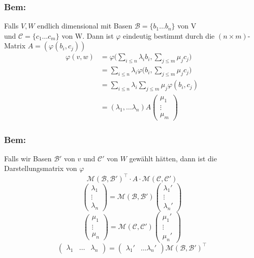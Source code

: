 \documentclass[titlepage,12pt,a4paper,ngerman]{report}
\begin{document}
\subsubsection*{Bem:} Falls $V, W$ endlich dimensional mit Basen $\mathcal B = \{b_1 \dots b_n\}$ von V\\
und $\mathcal C = \{c_1 \dots c_m\}$ von W. Dann ist $\varphi$ eindeutig bestimmt durch die $(n \times m)$-Matrix $A= (\varphi(b_i, c_j))$
\begin{align*}
\varphi(v, w) &= \varphi \bigg(\sum_{i \leq n} \lambda_i b_i, \sum_{j \leq m}\mu_j c_j\bigg)\\
&= \sum_{i \leq n} \lambda_i \varphi \bigg(b_i, \sum_{j \leq m} \mu_j c_j \bigg)\\
&= \sum_{i \leq n} \lambda_i \sum_{j \leq m} \mu_j \varphi(b_i, c_j)\\
&= (\lambda_1, \dots \lambda_n)A \begin{pmatrix}
\mu_1 \\ \vdots \\ \mu_m
\end{pmatrix}
\end{align*}

\subsubsection{Bem:}
Falls wir Basen $ \mathcal{B}' $ von $ v $ und $ \mathcal{C}' $ von $ W $ gewählt hätten, dann ist die Darstellungsmatrix von $ \varphi $
$$\mathcal{M}(\mathcal{B},\mathcal{B}')^\top \cdot A \cdot \mathcal{M}(\mathcal{C}, \mathcal{C}')$$
$$ \begin{pmatrix}
\lambda_1\\
\vdots\\
\lambda_n
\end{pmatrix} = \mathcal{M}(\mathcal{B},\mathcal{B}') \begin{pmatrix}
\lambda_1'\\
\vdots\\
\lambda_n'
\end{pmatrix}$$
$$ \begin{pmatrix}
\mu_1\\
\vdots\\
\mu_n
\end{pmatrix} = \mathcal{M}(\mathcal{C},\mathcal{C}') \begin{pmatrix}
\mu_1'\\
\vdots\\
\mu_n'
\end{pmatrix}$$
$$\begin{pmatrix}
\lambda_1 & \dots & \lambda_n
\end{pmatrix} = \begin{pmatrix}
\lambda_1' & \dots \lambda_n'
\end{pmatrix} \mathcal{M}(\mathcal{B},\mathcal{B}')^\top$$
\end{document}
